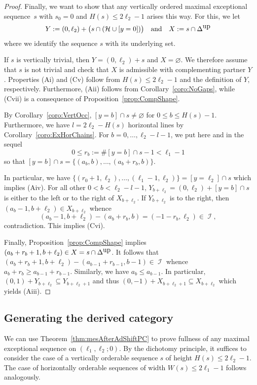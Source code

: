 \documentclass[11pt]{article}
\theoremstyle{definition}
\numberwithin{equation}{section}
\newcommand{\cH}{\mathcal{H}}
\newcommand{\CI}{{\mathcal I}}
\newcommand{\nImm}{\operatorname{\CI}}
\newcommand{\cl}{s}
\newcommand{\DeltaUp}{\Delta^{\mbox{\tiny up}}}
\newcommand{\nl}{{l}}
\newcommand{\mes}{maximal exceptional sequence}
\renewcommand{\sharp}{\#}
\begin{document}
\begin{proof}
Finally, we want to show that any vertically
ordered {\mes}~$\cl$ with $\cl_0=0$ and $H(\cl)
\leq2\ell_2-1$ arises this way. For this, we 
let
$$
Y:=(0,\ell_2)+\big(\cl\cap(\cH\cup[y=0])\big)
\quad\mbox{and}\quad X:=\cl\cap\DeltaUp
$$ 
where we identify the sequence $\cl$ with its
underlying set. 

If $\cl$ is vertically trivial, 
then $Y=(0,\ell_2)+\cl$ and $X=\varnothing$. 
We therefore assume that $\cl$ is not 
trivial and check that $X$ is admissible 
with complementing partner $Y$. Properties 
(Ai) and (Cv) follow from $H(\cl)\leq2\ell_2-1$ 
and the definition of $Y$, respectively. 
Furthermore, (Aii) follows from
Corollary~\ref{coro:NoGaps}, while (Cvii) 
is a consequence of 
Proposition~\ref{prop:CompShape}.

By Corollary~\ref{coro:VertOcc}, 
$[y=b]\cap\cl\not=\varnothing$ for 
$0\leq b\leq H(\cl)-1$. Furthermore,
we have $\nl=2\ell_2-H(\cl)$ horizontal lines 
by Corollary~\ref{coro:ExHorChains}. {For 
$b=0,\ldots,\ell_2-\nl-1$, we put here and in the sequel
\begin{equation}\label{eq:rb}
0\leq r_b:=\sharp[y=b]\cap\cl-1<\ell_1-1
\end{equation}
so that $[y=b]\cap\cl=\{(a_b,b),\ldots,(a_b+r_b,b)\}$.} 

In particular, we have 
$\{(r_0+1,\ell_2),\ldots,(\ell_1-1,\ell_2)\}
=[y=\ell_2]\cap\cl$ which implies (Aiv). 
For all other $0<b<\ell_2-\nl-1$, 
$Y_{b+\ell_2}=(0,\ell_2)+[y=b]\cap\cl$ is either 
to the left or to the right of 
$X_{b+\ell_2}$. If $Y_{b+\ell_2}$ is to the right, 
then $(a_b-1,b+\ell_2)\in X_{b+\ell_2}$ whence 
$$
(a_b-1,b+\ell_2)-(a_b+r_b,b)=
(-1-r_b,\ell_2)\in\nImm,
$$
contradiction. This implies (Cvi).

Finally, Proposition~\ref{prop:CompShape}
implies $(a_b+r_b+1,b+\ell_2)
\in X=\cl\cap\DeltaUp$. It follows that 
$(a_b+r_b+1,b+\ell_2)-(a_{b-1}
+r_{b-1},b-1)\in\nImm$ whence 
$a_b+r_b\geq a_{b-1}+r_{b-1}$. 
Similarly, we have $a_b\leq a_{b-1}$. 
In particular, $(0,1)+Y_{b+\ell_2}
\subseteq Y_{b+\ell_2+1}$
and thus $(0,-1)+X_{b+\ell_2+1}
\subseteq X_{b+\ell_2}$
which yields (Aiii).
\end{proof}

\subsection{Generating the derived category}
\label{subsec:ProofPaPb}

We can use Theorem~\ref{thm:mesAfterAdShiftPC} 
to prove fullness of any {\mes} on 
$(\ell_1,\ell_2;0)$. By the dichotomy {principle}, it 
suffices to consider the case of a vertically 
orderable sequence $\cl$ of height 
$H(\cl)\leq2\ell_2-1$. The case of horizontally
orderable sequences of width $W(\cl)\leq2\ell_1-1$
follows analogously.
\end{document}
